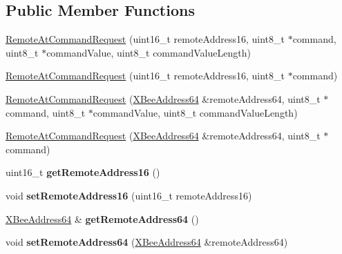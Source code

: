 \subsection*{\-Public \-Member \-Functions}
\begin{DoxyCompactItemize}
\item 
\hyperlink{classRemoteAtCommandRequest_ac6977fe584bab7d7414b0c45d1ae37cc}{\-Remote\-At\-Command\-Request} (uint16\-\_\-t remote\-Address16, uint8\-\_\-t $\ast$command, uint8\-\_\-t $\ast$command\-Value, uint8\-\_\-t command\-Value\-Length)
\item 
\hyperlink{classRemoteAtCommandRequest_ae8139e39010dcd8956a4281109885a81}{\-Remote\-At\-Command\-Request} (uint16\-\_\-t remote\-Address16, uint8\-\_\-t $\ast$command)
\item 
\hyperlink{classRemoteAtCommandRequest_ae49de42cdec0b9689882e2372a3bae1d}{\-Remote\-At\-Command\-Request} (\hyperlink{classXBeeAddress64}{\-X\-Bee\-Address64} \&remote\-Address64, uint8\-\_\-t $\ast$command, uint8\-\_\-t $\ast$command\-Value, uint8\-\_\-t command\-Value\-Length)
\item 
\hyperlink{classRemoteAtCommandRequest_aa01b3f59d62d444ad78d6f1bbf8124aa}{\-Remote\-At\-Command\-Request} (\hyperlink{classXBeeAddress64}{\-X\-Bee\-Address64} \&remote\-Address64, uint8\-\_\-t $\ast$command)
\item 
\hypertarget{classRemoteAtCommandRequest_a1802fa7c5d644184f19fcd3da839f08a}{uint16\-\_\-t {\bfseries get\-Remote\-Address16} ()}\label{classRemoteAtCommandRequest_a1802fa7c5d644184f19fcd3da839f08a}

\item 
\hypertarget{classRemoteAtCommandRequest_a91d4ee0fa25a634e419df1b0059f6073}{void {\bfseries set\-Remote\-Address16} (uint16\-\_\-t remote\-Address16)}\label{classRemoteAtCommandRequest_a91d4ee0fa25a634e419df1b0059f6073}

\item 
\hypertarget{classRemoteAtCommandRequest_ab6c602ded638f7740ac69319915e0389}{\hyperlink{classXBeeAddress64}{\-X\-Bee\-Address64} \& {\bfseries get\-Remote\-Address64} ()}\label{classRemoteAtCommandRequest_ab6c602ded638f7740ac69319915e0389}

\item 
\hypertarget{classRemoteAtCommandRequest_abf42b8f760f1f1959de090f4493e928b}{void {\bfseries set\-Remote\-Address64} (\hyperlink{classXBeeAddress64}{\-X\-Bee\-Address64} \&remote\-Address64)}\label{classRemoteAtCommandRequest_abf42b8f760f1f1959de090f4493e928b}


\end{DoxyCompactItemize}
